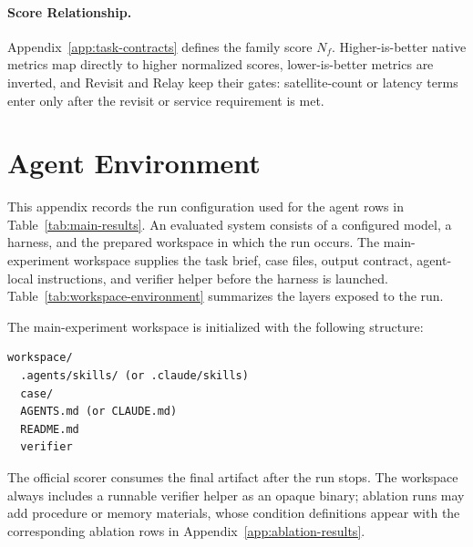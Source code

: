 \documentclass[]{mosi}
\begin{document}
\paragraph{Score Relationship.} Appendix~\ref{app:task-contracts} defines the family score \(N_f\). Higher-is-better native metrics map directly to higher normalized scores, lower-is-better metrics are inverted, and Revisit and Relay keep their gates: satellite-count or latency terms enter only after the revisit or service requirement is met.

\section{Agent Environment}
\label{app:agent-workspace}

This appendix records the run configuration used for the agent rows in Table~\ref{tab:main-results}. An evaluated system consists of a configured model, a harness, and the prepared workspace in which the run occurs. The main-experiment workspace supplies the task brief, case files, output contract, agent-local instructions, and verifier helper before the harness is launched. Table~\ref{tab:workspace-environment} summarizes the layers exposed to the run.

The main-experiment workspace is initialized with the following structure:
\begin{Verbatim}[fontsize=\scriptsize, frame=single, framesep=1mm]
workspace/
  .agents/skills/ (or .claude/skills)
  case/
  AGENTS.md (or CLAUDE.md)
  README.md
  verifier
\end{Verbatim}

The official scorer consumes the final artifact after the run stops. The workspace always includes a runnable verifier helper as an opaque binary; ablation runs may add procedure or memory materials, whose condition definitions appear with the corresponding ablation rows in Appendix~\ref{app:ablation-results}.
\end{document}
